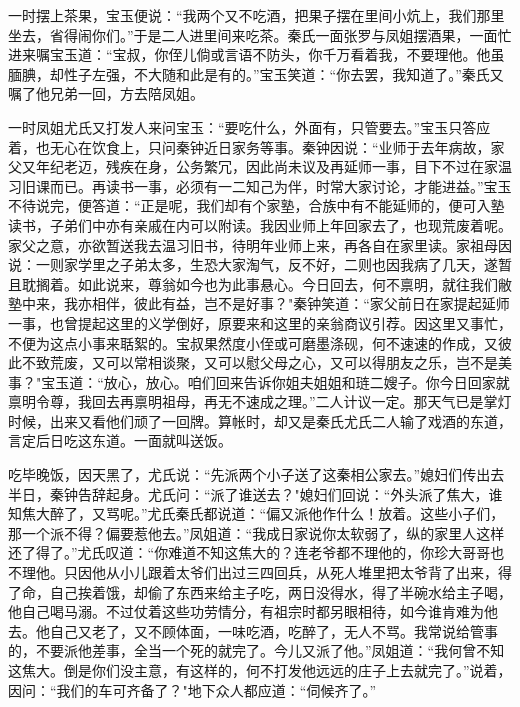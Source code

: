 一时摆上茶果，宝玉便说：“我两个又不吃酒，把果子摆在里间小炕上，我们那里坐去，省得闹你们。”于是二人进里间来吃茶。秦氏一面张罗与凤姐摆酒果，一面忙进来嘱宝玉道：“宝叔，你侄儿倘或言语不防头，你千万看着我，不要理他。他虽腼腆，却性子左强，不大随和此是有的。”宝玉笑道：“你去罢，我知道了。”秦氏又嘱了他兄弟一回，方去陪凤姐。

一时凤姐尤氏又打发人来问宝玉：“要吃什么，外面有，只管要去。”宝玉只答应着，也无心在饮食上，只问秦钟近日家务等事。秦钟因说：“业师于去年病故，家父又年纪老迈，残疾在身，公务繁冗，因此尚未议及再延师一事，目下不过在家温习旧课而已。再读书一事，必须有一二知己为伴，时常大家讨论，才能进益。”宝玉不待说完，便答道：“正是呢，我们却有个家塾，合族中有不能延师的，便可入塾读书，子弟们中亦有亲戚在内可以附读。我因业师上年回家去了，也现荒废着呢。家父之意，亦欲暂送我去温习旧书，待明年业师上来，再各自在家里读。家祖母因说：一则家学里之子弟太多，生恐大家淘气，反不好，二则也因我病了几天，遂暂且耽搁着。如此说来，尊翁如今也为此事悬心。今日回去，何不禀明，就往我们敝塾中来，我亦相伴，彼此有益，岂不是好事？"秦钟笑道：“家父前日在家提起延师一事，也曾提起这里的义学倒好，原要来和这里的亲翁商议引荐。因这里又事忙，不便为这点小事来聒絮的。宝叔果然度小侄或可磨墨涤砚，何不速速的作成，又彼此不致荒废，又可以常相谈聚，又可以慰父母之心，又可以得朋友之乐，岂不是美事？"宝玉道：“放心，放心。咱们回来告诉你姐夫姐姐和琏二嫂子。你今日回家就禀明令尊，我回去再禀明祖母，再无不速成之理。”二人计议一定。那天气已是掌灯时候，出来又看他们顽了一回牌。算帐时，却又是秦氏尤氏二人输了戏酒的东道，言定后日吃这东道。一面就叫送饭。

吃毕晚饭，因天黑了，尤氏说：“先派两个小子送了这秦相公家去。”媳妇们传出去半日，秦钟告辞起身。尤氏问：“派了谁送去？"媳妇们回说：“外头派了焦大，谁知焦大醉了，又骂呢。”尤氏秦氏都说道：“偏又派他作什么！放着。这些小子们，那一个派不得？偏要惹他去。”凤姐道：“我成日家说你太软弱了，纵的家里人这样还了得了。”尤氏叹道：“你难道不知这焦大的？连老爷都不理他的，你珍大哥哥也不理他。只因他从小儿跟着太爷们出过三四回兵，从死人堆里把太爷背了出来，得了命，自己挨着饿，却偷了东西来给主子吃，两日没得水，得了半碗水给主子喝，他自己喝马溺。不过仗着这些功劳情分，有祖宗时都另眼相待，如今谁肯难为他去。他自己又老了，又不顾体面，一味吃酒，吃醉了，无人不骂。我常说给管事的，不要派他差事，全当一个死的就完了。今儿又派了他。”凤姐道：“我何曾不知这焦大。倒是你们没主意，有这样的，何不打发他远远的庄子上去就完了。”说着，因问：“我们的车可齐备了？"地下众人都应道：“伺候齐了。”

